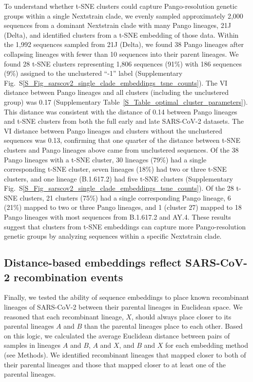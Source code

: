 \documentclass[webpdf,contemporary,large,single]{oup-authoring-template}%
\theoremstyle{thmstyleone}%
\theoremstyle{thmstyletwo}%
\theoremstyle{thmstylethree}%
\begin{document}
To understand whether t-SNE clusters could capture Pango-resolution genetic groups within a single Nextstrain clade, we evenly sampled approximately 2,000 sequences from a dominant Nextstrain clade with many Pango lineages, 21J (Delta), and identified clusters from a t-SNE embedding of those data.
Within the 1,992 sequences sampled from 21J (Delta), we found 38 Pango lineages after collapsing lineages with fewer than 10 sequences into their parent lineages.
We found 28 t-SNE clusters representing 1,806 sequences (91\%) with 186 sequences (9\%) assigned to the unclustered ``-1'' label (Supplementary Fig.~S\ref{S_Fig_sarscov2_single_clade_embeddings_tsne_counts}).
The VI distance between Pango lineages and all clusters (including the unclustered group) was 0.17 (Supplementary Table~\ref{S_Table_optimal_cluster_parameters}).
This distance was consistent with the distance of 0.14 between Pango lineages and t-SNE clusters from both the full early and late SARS-CoV-2 datasets.
The VI distance between Pango lineages and clusters without the unclustered sequences was 0.13, confirming that one quarter of the distance between t-SNE clusters and Pango lineages above came from unclustered sequences.
Of the 38 Pango lineages with a t-SNE cluster, 30 lineages (79\%) had a single corresponding t-SNE cluster, seven lineages (18\%) had two or three t-SNE clusters, and one lineage (B.1.617.2) had five t-SNE clusters (Supplementary Fig.~S\ref{S_Fig_sarscov2_single_clade_embeddings_tsne_counts}).
Of the 28 t-SNE clusters, 21 clusters (75\%) had a single corresponding Pango lineage, 6 (21\%) mapped to two or three Pango lineages, and 1 (cluster 27) mapped to 18 Pango lineages with most sequences from B.1.617.2 and AY.4.
These results suggest that clusters from t-SNE embeddings can capture more Pango-resolution genetic groups by analyzing sequences within a specific Nextstrain clade.

\subsection{Distance-based embeddings reflect SARS-CoV-2 recombination events}

Finally, we tested the ability of sequence embeddings to place known recombinant lineages of SARS-CoV-2 between their parental lineages in Euclidean space.
We reasoned that each recombinant lineage, $X$, should always place closer to its parental lineages $A$ and $B$ than the parental lineages place to each other.
Based on this logic, we calculated the average Euclidean distance between pairs of samples in lineages $A$ and $B$, $A$ and $X$, and $B$ and $X$ for each embedding method (see Methods).
We identified recombinant lineages that mapped closer to both of their parental lineages and those that mapped closer to at least one of the parental lineages.
\end{document}
